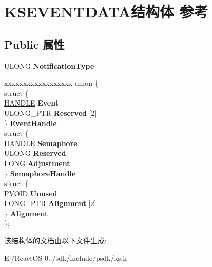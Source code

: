\hypertarget{struct_k_s_e_v_e_n_t_d_a_t_a}{}\section{K\+S\+E\+V\+E\+N\+T\+D\+A\+T\+A结构体 参考}
\label{struct_k_s_e_v_e_n_t_d_a_t_a}
\subsection*{Public 属性}
\begin{DoxyCompactItemize}
\item 
\mbox{\label{struct_k_s_e_v_e_n_t_d_a_t_a_a3c9b214e2570e72540e3b4d44fd664c0}} 
U\+L\+O\+NG {\bfseries Notification\+Type}
\item 
\mbox{\label{struct_k_s_e_v_e_n_t_d_a_t_a_ad647ee28482be6646d96d2db3d71727c}} 
\begin{tabbing}
xx\=xx\=xx\=xx\=xx\=xx\=xx\=xx\=xx\=\kill
union \{\\
\>struct \{\\
\>\>\hyperlink{interfacevoid}{HANDLE} {\bfseries Event}\\
\>\>ULONG\_PTR {\bfseries Reserved} \mbox{[}2\mbox{]}\\
\>\} {\bfseries EventHandle}\\
\>struct \{\\
\>\>\hyperlink{interfacevoid}{HANDLE} {\bfseries Semaphore}\\
\>\>ULONG {\bfseries Reserved}\\
\>\>LONG {\bfseries Adjustment}\\
\>\} {\bfseries SemaphoreHandle}\\
\>struct \{\\
\>\>\hyperlink{interfacevoid}{PVOID} {\bfseries Unused}\\
\>\>LONG\_PTR {\bfseries Alignment} \mbox{[}2\mbox{]}\\
\>\} {\bfseries Alignment}\\
\}; \\

\end{tabbing}\end{DoxyCompactItemize}


该结构体的文档由以下文件生成\+:\begin{DoxyCompactItemize}
\item 
E\+:/\+React\+O\+S-\/0../sdk/include/psdk/ks.\+h\end{DoxyCompactItemize}
